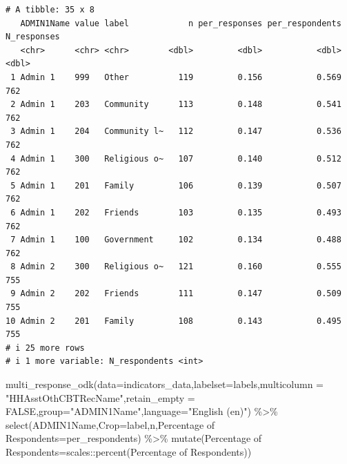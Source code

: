 \documentclass[
  letterpaper,
  DIV=11,
  numbers=noendperiod]{scrreprt}
\newenvironment{Shaded}{\begin{snugshade}}{\end{snugshade}}
\newcommand{\AttributeTok}[1]{\textcolor[rgb]{0.40,0.45,0.13}{#1}}
\newcommand{\ConstantTok}[1]{\textcolor[rgb]{0.56,0.35,0.01}{#1}}
\newcommand{\FunctionTok}[1]{\textcolor[rgb]{0.28,0.35,0.67}{#1}}
\newcommand{\NormalTok}[1]{\textcolor[rgb]{0.00,0.23,0.31}{#1}}
\newcommand{\OtherTok}[1]{\textcolor[rgb]{0.00,0.23,0.31}{#1}}
\newcommand{\SpecialCharTok}[1]{\textcolor[rgb]{0.37,0.37,0.37}{#1}}
\newcommand{\StringTok}[1]{\textcolor[rgb]{0.13,0.47,0.30}{#1}}
\begin{document}
\begin{verbatim}
# A tibble: 35 x 8
   ADMIN1Name value label            n per_responses per_respondents N_responses
   <chr>      <chr> <chr>        <dbl>         <dbl>           <dbl>       <dbl>
 1 Admin 1    999   Other          119         0.156           0.569         762
 2 Admin 1    203   Community      113         0.148           0.541         762
 3 Admin 1    204   Community l~   112         0.147           0.536         762
 4 Admin 1    300   Religious o~   107         0.140           0.512         762
 5 Admin 1    201   Family         106         0.139           0.507         762
 6 Admin 1    202   Friends        103         0.135           0.493         762
 7 Admin 1    100   Government     102         0.134           0.488         762
 8 Admin 2    300   Religious o~   121         0.160           0.555         755
 9 Admin 2    202   Friends        111         0.147           0.509         755
10 Admin 2    201   Family         108         0.143           0.495         755
# i 25 more rows
# i 1 more variable: N_respondents <int>
\end{verbatim}

\begin{Shaded}
\begin{Highlighting}[]
\FunctionTok{multi\_response\_odk}\NormalTok{(}\AttributeTok{data=}\NormalTok{indicators\_data,}\AttributeTok{labelset=}\NormalTok{labels,}\AttributeTok{multicolumn =} \StringTok{"HHAsstOthCBTRecName"}\NormalTok{,}\AttributeTok{retain\_empty =} \ConstantTok{FALSE}\NormalTok{,}\AttributeTok{group=}\StringTok{"ADMIN1Name"}\NormalTok{,}\AttributeTok{language=}\StringTok{"English (en)"}\NormalTok{) }\SpecialCharTok{\%\textgreater{}\%}
  \FunctionTok{select}\NormalTok{(ADMIN1Name,}\AttributeTok{Crop=}\NormalTok{label,n,}\StringTok{\textasciigrave{}}\AttributeTok{Percentage of Respondents}\StringTok{\textasciigrave{}}\OtherTok{=}\NormalTok{per\_respondents) }\SpecialCharTok{\%\textgreater{}\%}
    \FunctionTok{mutate}\NormalTok{(}\StringTok{\textasciigrave{}}\AttributeTok{Percentage of Respondents}\StringTok{\textasciigrave{}}\OtherTok{=}\NormalTok{scales}\SpecialCharTok{::}\FunctionTok{percent}\NormalTok{(}\StringTok{\textasciigrave{}}\AttributeTok{Percentage of Respondents}\StringTok{\textasciigrave{}}\NormalTok{))}
\end{Highlighting}
\end{Shaded}
\end{document}
